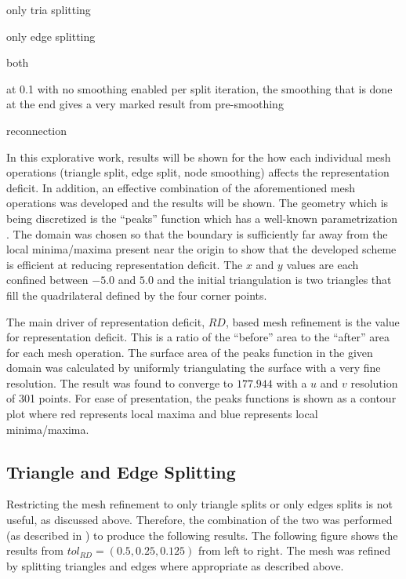 only tria splitting

only edge splitting

both

at 0.1 with no smoothing enabled per split iteration, the smoothing that is done at the end gives a very marked result from pre-smoothing

reconnection

In this explorative work, results will be shown for the how each
individual mesh operations (triangle split, edge split, node smoothing)
affects the representation deficit. In addition, an effective
combination of the aforementioned mesh operations was developed and the
results will be shown. The geometry which is being discretized is the
``peaks'' function which has a well-known parametrization
\cite{peaksMatlab}. The domain was chosen so that the boundary is
sufficiently far away from the local minima/maxima present near the origin to
show that the developed scheme is efficient at reducing representation
deficit. The $x$ and $y$ values are each confined between $-5.0$ and
$5.0$ and the initial triangulation is two triangles that fill the
quadrilateral defined by the four corner points.

The main driver of representation deficit, $RD$, based mesh refinement
is the value for representation deficit. This is a ratio of the
``before'' area to the ``after'' area for each mesh operation. The
surface area of the peaks function in the given domain was calculated by
uniformly triangulating the surface with a very fine resolution. The
result was found to converge to $177.944$ with a $u$ and $v$ resolution
of 301 points. For ease of presentation, the peaks functions is shown as
a contour plot where red represents local maxima and blue represents
local minima/maxima.

\subsection{Triangle and Edge Splitting}
Restricting the mesh refinement to only triangle splits or only edges
splits is not useful, as discussed above. Therefore, the combination of
the two was performed (as described in )
to produce the following results. The following figure shows the results
from $tol_{RD}=\left(0.5,0.25,0.125\right)$ from left to right. The mesh was
refined by splitting triangles and edges where appropriate as described
above.


